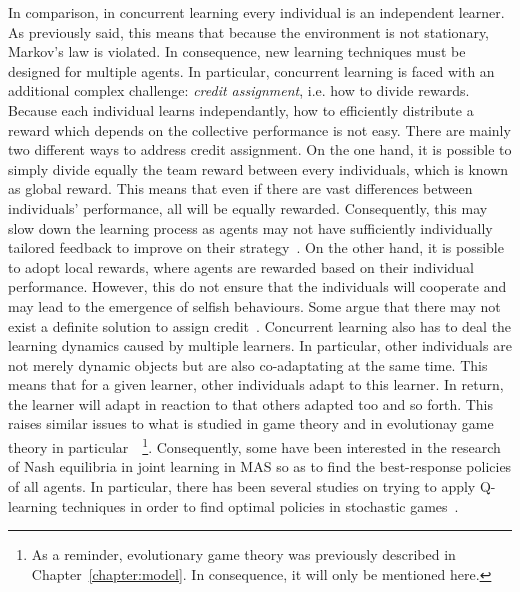     In comparison, in concurrent learning every individual is an independent learner. As previously said, this means that because the environment is not stationary, Markov's law is violated. In consequence, new learning techniques must be designed for multiple agents. In particular, concurrent learning is faced with an additional complex challenge: \emph{credit assignment}, i.e. how to divide rewards. Because each individual learns independantly, how to efficiently distribute a reward which depends on the collective performance is not easy. There are mainly two different ways to address credit assignment. On the one hand, it is possible to simply divide equally the team reward between every individuals, which is known as global reward. This means that even if there are vast differences between individuals' performance, all will be equally rewarded. Consequently, this may slow down the learning process as agents may not have sufficiently individually tailored feedback to improve on their strategy~\parencite{Wolpert2001}. On the other hand, it is possible to adopt local rewards, where agents are rewarded based on their individual performance. However, this do not ensure that the individuals will cooperate and may lead to the emergence of selfish behaviours. Some argue that there may not exist a definite solution to assign credit~\parencite{Balch1999}. Concurrent learning also has to deal the learning dynamics caused by multiple learners. In particular, other individuals are not merely dynamic objects but are also co-adaptating at the same time. This means that for a given learner, other individuals adapt to this learner. In return, the learner will adapt in reaction to that others adapted too and so forth. This raises similar issues to what is studied in game theory and in evolutionay game theory in particular~\parencite{MaynardSmith1973, Fudenberg1998, Bloembergen2015}~\footnote{As a reminder, evolutionary game theory was previously described in Chapter~\ref{chapter:model}. In consequence, it will only be mentioned here.}. Consequently, some have been interested in the research of Nash equilibria in joint learning in MAS so as to find the best-response policies of all agents. In particular, there has been several studies on trying to apply Q-learning techniques in order to find optimal policies in stochastic games~\parencite{Littman1994, Claus1998, Bowling2003, Greenwald2005, Kapetanakis2005}.

